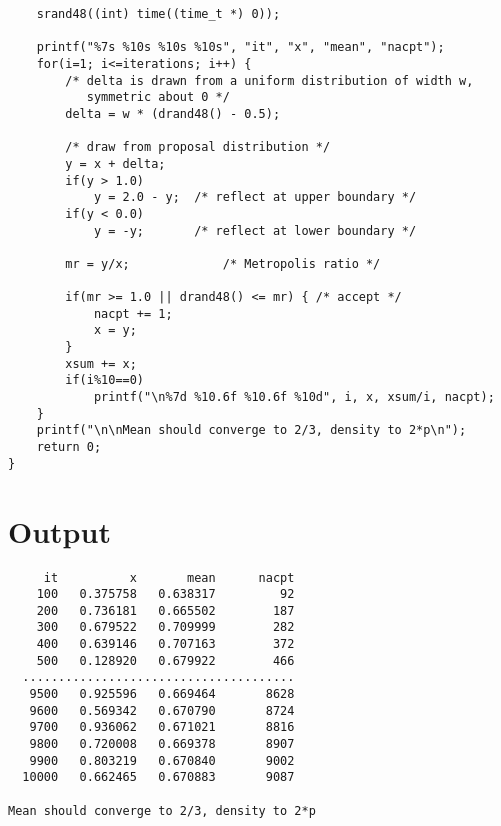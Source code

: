 \documentclass[11pt]{article}
\begin{document}
\begin{verbatim}
    srand48((int) time((time_t *) 0));

    printf("%7s %10s %10s %10s", "it", "x", "mean", "nacpt");
    for(i=1; i<=iterations; i++) {
        /* delta is drawn from a uniform distribution of width w,
           symmetric about 0 */
        delta = w * (drand48() - 0.5);

        /* draw from proposal distribution */
        y = x + delta;
        if(y > 1.0)
            y = 2.0 - y;  /* reflect at upper boundary */
        if(y < 0.0)
            y = -y;       /* reflect at lower boundary */
        
        mr = y/x;             /* Metropolis ratio */

        if(mr >= 1.0 || drand48() <= mr) { /* accept */
            nacpt += 1;
            x = y;
        }
        xsum += x;
        if(i%10==0)
            printf("\n%7d %10.6f %10.6f %10d", i, x, xsum/i, nacpt);
    }
    printf("\n\nMean should converge to 2/3, density to 2*p\n");
    return 0;
}
\end{verbatim}

\section{Output}
\begin{verbatim}
     it          x       mean      nacpt
    100   0.375758   0.638317         92
    200   0.736181   0.665502        187
    300   0.679522   0.709999        282
    400   0.639146   0.707163        372
    500   0.128920   0.679922        466
  ......................................
   9500   0.925596   0.669464       8628
   9600   0.569342   0.670790       8724
   9700   0.936062   0.671021       8816
   9800   0.720008   0.669378       8907
   9900   0.803219   0.670840       9002
  10000   0.662465   0.670883       9087

Mean should converge to 2/3, density to 2*p
\end{verbatim}


\end{document}
